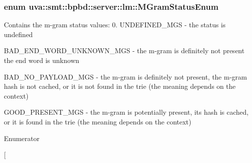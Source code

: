 \subsubsection[{M\+Gram\+Status\+Enum}]{\setlength{\rightskip}{0pt plus 5cm}enum {\bf uva\+::smt\+::bpbd\+::server\+::lm\+::\+M\+Gram\+Status\+Enum}}\label{namespaceuva_1_1smt_1_1bpbd_1_1server_1_1lm_ab9b3e7382b561dcb8abcd6b55e9b796a}
Contains the m-\/gram status values\+: 0. U\+N\+D\+E\+F\+I\+N\+E\+D\+\_\+\+M\+G\+S -\/ the status is undefined
\begin{DoxyEnumerate}
\item B\+A\+D\+\_\+\+E\+N\+D\+\_\+\+W\+O\+R\+D\+\_\+\+U\+N\+K\+N\+O\+W\+N\+\_\+\+M\+G\+S -\/ the m-\/gram is definitely not present the end word is unknown
\item B\+A\+D\+\_\+\+N\+O\+\_\+\+P\+A\+Y\+L\+O\+A\+D\+\_\+\+M\+G\+S -\/ the m-\/gram is definitely not present, the m-\/gram hash is not cached, or it is not found in the trie (the meaning depends on the context)
\item G\+O\+O\+D\+\_\+\+P\+R\+E\+S\+E\+N\+T\+\_\+\+M\+G\+S -\/ the m-\/gram is potentially present, its hash is cached, or it is found in the trie (the meaning depends on the context) 
\end{DoxyEnumerate}\begin{Desc}
\item[Enumerator]\par
\begin{description}
\item[{\em 
\hypertarget{namespaceuva_1_1smt_1_1bpbd_1_1server_1_1lm_ab9b3e7382b561dcb8abcd6b55e9b796aa9019f6deb96568ca044e6c1849e446cb}{}U\+N\+D\+E\+F\+I\+N\+E\+D\+\_\+\+M\+G\+S\label{namespaceuva_1_1smt_1_1bpbd_1_1server_1_1lm_ab9b3e7382b561dcb8abcd6b55e9b796aa9019f6deb96568ca044e6c1849e446cb}
}]\item[{\em 
}
\end{description}
\end{Desc}
